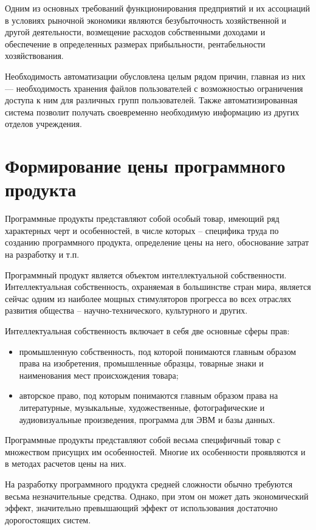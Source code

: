 \documentclass[utf8,usehyperref,12pt]{G7-32}
\begin{document}
Одним из основных требований функционирования предприятий и их ассоциаций в условиях рыночной экономики являются безубыточность хозяйственной и другой деятельности, возмещение расходов собственными доходами и обеспечение в определенных размерах прибыльности, рентабельности хозяйствования.

Необходимость автоматизации обусловлена целым рядом причин, главная из них — необходимость хранения файлов пользователей с возможностью ограничения доступа к ним для различных групп пользователей. Также автоматизированная система позволит получать своевременно необходимую информацию из других отделов учреждения.

\section{Формирование цены программного продукта}
Программные продукты представляют собой особый товар, имеющий ряд характерных черт и особенностей, в числе которых – специфика труда по созданию программного продукта, определение цены на него, обоснование затрат на разработку и т.п.

Программный продукт является объектом интеллектуальной собственности. Интеллектуальная собственность, охраняемая в большинстве стран мира, является сейчас одним из наиболее мощных стимуляторов прогресса во всех отраслях развития общества – научно-технического, культурного и других.

Интеллектуальная собственность включает в себя две основные сферы прав: 
\begin{itemize}
 \item промышленную собственность, под которой понимаются главным образом права на изобретения, промышленные образцы, товарные знаки и наименования мест происхождения товара;
 \item авторское право, под которым понимаются главным образом права на литературные, музыкальные, художественные, фотографические и аудиовизуальные произведения, программа для ЭВМ и базы данных.
\end{itemize}

Программные продукты представляют собой весьма специфичный товар с множеством присущих им особенностей. Многие их особенности проявляются и в методах расчетов цены на них.

 На разработку программного продукта средней сложности обычно требуются весьма незначительные средства. Однако, при этом он может дать экономический эффект, значительно превышающий эффект от использования достаточно дорогостоящих систем.
 
\end{document}
